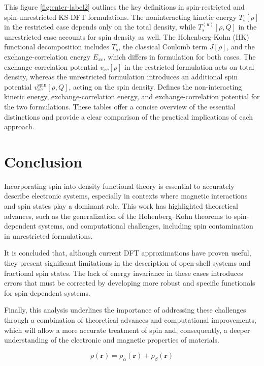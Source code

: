 \documentclass[%
 preprint, linenumbers,
 amsmath,amssymb,
 aps, physrev,
]{revtex4-2}
\begin{document}
This figure \ref{fig:enter-label2} outlines the key definitions in spin-restricted and spin-unrestricted KS-DFT formulations. The noninteracting kinetic energy \( T_s[\rho] \) in the restricted case depends only on the total density, while \( T_s^{(u)}[\rho, Q] \) in the unrestricted case accounts for spin density as well. The Hohenberg-Kohn (HK) functional decomposition includes \( T_s \), the classical Coulomb term \( J[\rho] \), and the exchange-correlation energy \( E_{xc} \), which differs in formulation for both cases. The exchange-correlation potential \( v_{xc}[\rho] \) in the restricted formulation acts on total density, whereas the unrestricted formulation introduces an additional spin potential \( v_{xc}^{\text{spin}}[\rho, Q] \), acting on the spin density.
Defines the non-interacting kinetic energy, exchange-correlation energy, and exchange-correlation potential for the two formulations. These tables offer a concise overview of the essential distinctions and provide a clear comparison of the practical implications of each approach.


\section{Conclusion}
Incorporating spin into density functional theory is essential to accurately describe electronic systems, especially in contexts where magnetic interactions and spin states play a dominant role. This work has highlighted theoretical advances, such as the generalization of the Hohenberg–Kohn theorems to spin-dependent systems, and computational challenges, including spin contamination in unrestricted formulations.

It is concluded that, although current DFT approximations have proven useful, they present significant limitations in the description of open-shell systems and fractional spin states. The lack of energy invariance in these cases introduces errors that must be corrected by developing more robust and specific functionals for spin-dependent systems.

Finally, this analysis underlines the importance of addressing these challenges through a combination of theoretical advances and computational improvements, which will allow a more accurate treatment of spin and, consequently, a deeper understanding of the electronic and magnetic properties of materials.

\begin{equation}
    \rho(\mathbf{r}) = \rho_{\alpha}(\mathbf{r}) + \rho_{\beta}(\mathbf{r})
\end{equation}
\end{document}
